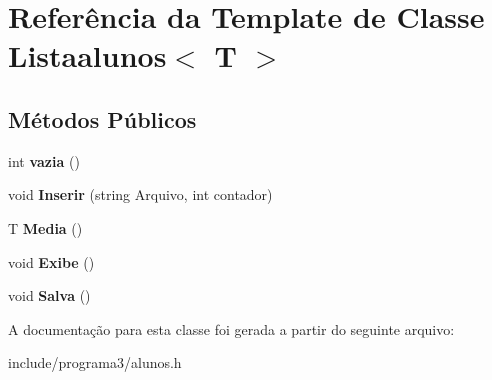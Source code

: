 \hypertarget{class_listaalunos}{}\section{Referência da Template de Classe Listaalunos$<$ T $>$}
\label{class_listaalunos}
\subsection*{Métodos Públicos}
\begin{DoxyCompactItemize}
\item 
\mbox{\label{class_listaalunos_a98b1ed9ff40aa83a0500ff0712a39d7d}} 
int {\bfseries vazia} ()
\item 
\mbox{\label{class_listaalunos_aba52a245b2e1fd260a37371d5a96b4f6}} 
void {\bfseries Inserir} (string Arquivo, int contador)
\item 
\mbox{\label{class_listaalunos_a4157331a68a72e94717dfb2470b71dda}} 
T {\bfseries Media} ()
\item 
\mbox{\label{class_listaalunos_a624c9d8fecb5f38c0b776f801a686eda}} 
void {\bfseries Exibe} ()
\item 
\mbox{\label{class_listaalunos_a88638bddd7d9db032b9d4331218b9c4d}} 
void {\bfseries Salva} ()
\end{DoxyCompactItemize}


A documentação para esta classe foi gerada a partir do seguinte arquivo\+:\begin{DoxyCompactItemize}
\item 
include/programa3/alunos.\+h\end{DoxyCompactItemize}
